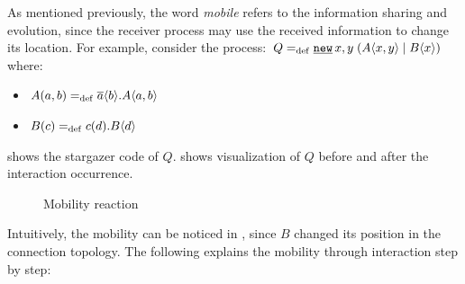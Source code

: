 As mentioned previously, the word \textit{mobile} refers to the information sharing and evolution, since the receiver process may use the received information to change its location. For example, consider the process: $Q\define\procres{x,y}{(\procpar{\proccall{A}{x,y}}{\proccall{B}{x}})}$ where:
\begin{itemize}
\item $A(a,b)=_{\mathrm{def}}{}\overline{a}\langle{b}\rangle.A\langle a,b\rangle$
\item $B(c)=_{\mathrm{def}}{}c({d}).B\langle d\rangle$
\end{itemize}


 shows the stargazer code of $Q$.   shows visualization of $Q$ before and after the interaction occurrence.

\raggedbottom
\begin{figure}[H]%
\centering
{}%
\hfill
{}%
\caption{Mobility reaction}
\label{pi_mobility_stargazer_react}%
\end{figure}
Intuitively, the mobility can be noticed in , since $B$ changed its position in the connection topology.
The following explains the mobility through interaction step by step:
